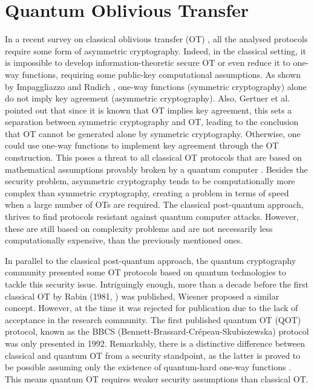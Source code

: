 


%

\chapter{Quantum Oblivious Transfer}


In a recent survey on classical oblivious transfer (OT) \cite{YAVV22}, all the analysed protocols require some form of asymmetric cryptography. Indeed, in the classical setting, it is impossible to develop information-theoretic secure OT or even reduce it to one-way functions, requiring some public-key computational assumptions. As shown by Impaggliazzo and Rudich \cite{IR89}, one-way functions (symmetric cryptography) alone do not imply key agreement (asymmetric cryptography). Also, Gertner et al. \cite{GKMRV00} pointed out that since it is known that OT implies key agreement, this sets a separation between symmetric cryptography and OT, leading to the conclusion that OT cannot be generated alone by symmetric cryptography. Otherwise, one could use one-way functions to implement key agreement through the OT construction. This poses a threat to all classical OT protocols \cite{EGL85, NP01, CO15} that are based on mathematical assumptions provably broken by a quantum computer \cite{Sho95}. Besides the security problem, asymmetric cryptography tends to be computationally more complex than symmetric cryptography, creating a problem in terms of speed when a large number of OTs are required. The classical post-quantum approach, thrives to find protocols resistant against quantum computer attacks. However, these are still based on complexity problems and are not necessarily less computationally expensive, than the previously mentioned ones. 

In parallel to the classical post-quantum approach, the quantum cryptography community presented some OT protocols based on quantum technologies to tackle this security issue. Intriguingly enough, more than a decade before the first classical OT by Rabin (1981, \cite{Rabin81}) was published, Wiesner proposed a similar concept. However, at the time it was rejected for publication due to the lack of acceptance in the research community. The first published quantum OT (QOT) protocol, known as the BBCS (Bennett-Brassard-Cr{\'e}peau-Skubiszewska) protocol \cite{BBCS92} was only presented in 1992. Remarkably, there is a distinctive difference between classical and quantum OT from a security standpoint, as the latter is proved to be possible assuming only the existence of quantum-hard one-way functions \cite{GLSV21, BCKM21}. This means quantum OT requires weaker security assumptions than classical OT.

